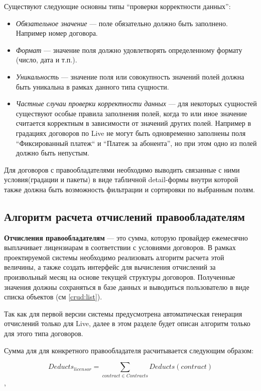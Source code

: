 Существуют следующие основны типы ``проверки корректности данных'':
\begin{itemize}
\item{
  \textit{Обязательное значение} --- поле обязательно должно быть заполнено. Например номер договора. 
}
\item{
  \textit{Формат} --- значение поля должно удовлетворять определенному формату (число, дата и т.п.).
}
\item{
  \textit{Уникальность} --- значение поля или совокупность значений полей должна быть уникальна в рамках
данного типа сущности.
}
\item{
  \textit{Частные случаи проверки корректности данных} --- для некоторых сущностей существуют особые правила заполнения полей,
  когда то или иное значение считается корректным в зависимости от значений других полей. 
  Например в градациях договоров по Live не могут быть одновременно заполнены поля ``Фиксированный платеж`` 
  и ``Платеж за абонента'', но при этом одно из полей должно быть непустым.
}
\end{itemize}

Для договоров с правообладателями необходимо выводить связанные с ними условия(градации и пакеты)
в виде табличной detail-формы внутри которой также должна быть возможность фильтрации и сортировки по выбранным полям.

\subsection{Алгоритм расчета отчислений правообладателям}
\label{live:deducts}
\textbf{Отчисления правообладателям} --- это сумма, которую провайдер ежемесячно выплачивает лицензиарам
в соответствии с условиями договоров. В рамках проектируемой системы необходимо реализовать алгоритм расчета
этой величины, а также создать интерфейс для вычисления отчислений за произвольный месяц на основе текущей 
структуры договоров. Полученные значения должны сохраняться в базе данных и выводиться пользователю 
в виде списка объектов (см \ref{crud:list}).

Так как для первой версии системы предусмотрена автоматическая генерация отчислений 
только для Live, далее в этом разделе будет описан алгоритм только для этого типа договоров.

Сумма для для конкретного правообладателя расчитывается следующим образом:

$$Deducts_{licensor} = \sum_{contract \in Contracts} Deducts(contract)$$,

